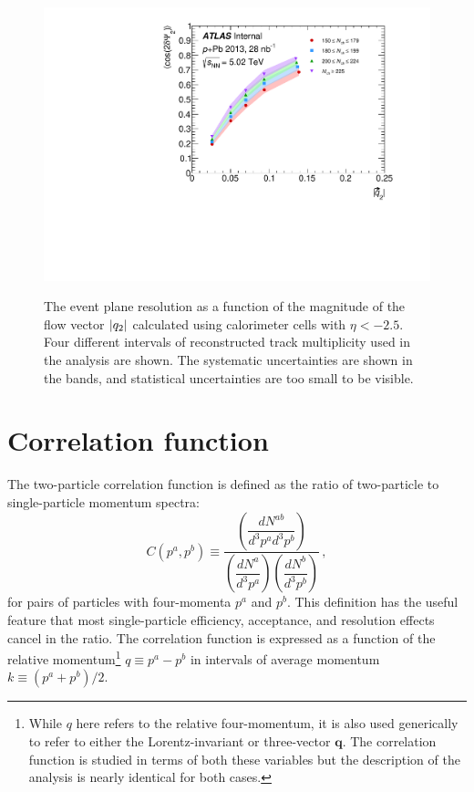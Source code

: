 \begin{figure}[t]
\centering
\includegraphics{epRes.pdf}\\
\caption{The event plane resolution as a function of the magnitude of the flow vector $|q_{2}|$ calculated using calorimeter cells with $\eta < -2.5$. Four different intervals of reconstructed track multiplicity \Nch used in the analysis are shown. The systematic uncertainties are shown in the bands, and statistical uncertainties are too small to be visible.}
\label{fig:ep_res}
\end{figure}


\section{Correlation function}
The two-particle correlation function is defined as the ratio of two-particle to single-particle momentum spectra:
\begin{equation}
  C\left(p^a, p^b\right) \equiv \dfrac{\left(\dfrac{dN^{ab}}{d^3p^a d^3p^b}\right)}{\left(\dfrac{dN^{a}}{d^3p^a}\right)\left(\dfrac{dN^{b}}{d^3p^b}\right)} \,,
\end{equation}
for pairs of particles with four-momenta $p^a$ and $p^b$.
This definition has the useful feature that most single-particle efficiency, acceptance, and resolution effects cancel in the ratio.
The correlation function is expressed as a function of the relative momentum\footnote{While $q$ here refers to the relative four-momentum, it is also used generically to refer to either the Lorentz-invariant \qinv or three-vector $\mathbf{q}$.
The correlation function is studied in terms of both these variables but the description of the analysis is nearly identical for both cases.} $q \equiv p^a - p^b$ in intervals of average momentum $k \equiv \left(p^a + p^b\right)/2$.

